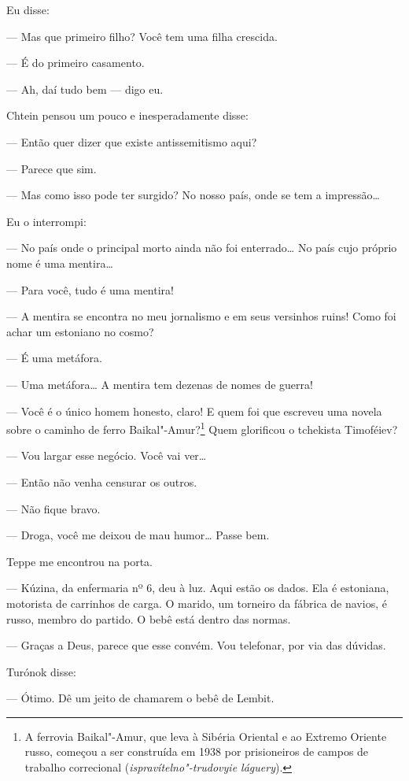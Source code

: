 Eu disse:

--- Mas que primeiro filho? Você tem uma filha crescida.

--- É do primeiro casamento.

--- Ah, daí tudo bem --- digo eu.

Chtein pensou um pouco e inesperadamente disse:

--- Então quer dizer que existe antissemitismo aqui?

--- Parece que sim.

--- Mas como isso pode ter surgido? No nosso país, onde se tem a
impressão\ldots{}

Eu o interrompi:

--- No país onde o principal morto ainda não foi enterrado\ldots{} No país
cujo próprio nome é uma mentira\ldots{}

--- Para você, tudo é uma mentira!

--- A mentira se encontra no meu jornalismo e em seus versinhos ruins!
Como foi achar um estoniano no cosmo?

--- É uma metáfora.

--- Uma metáfora\ldots{} A mentira tem dezenas de nomes de guerra!

--- Você é o único homem honesto, claro! E quem foi que escreveu uma
novela sobre o caminho de ferro Baikal"-Amur?\footnote{A ferrovia
  Baikal"-Amur, que leva à Sibéria Oriental e ao Extremo Oriente russo,
  começou a ser construída em 1938 por prisioneiros de campos de
  trabalho correcional (\emph{ispravítelno"-trudovyie láguery}).} Quem
glorificou o tchekista Timoféiev?

--- Vou largar esse negócio. Você vai ver\ldots{}

--- Então não venha censurar os outros.

--- Não fique bravo.

--- Droga, você me deixou de mau humor\ldots{} Passe bem.

Teppe me encontrou na porta.

--- Kúzina, da enfermaria nº 6, deu à luz. Aqui estão os dados. Ela é \label{ref4}
estoniana, motorista de carrinhos de carga. O marido, um torneiro da
fábrica de navios, é russo, membro do partido. O bebê está dentro das
normas.

--- Graças a Deus, parece que esse convém. Vou telefonar, por via das
dúvidas.

Turónok disse:

--- Ótimo. Dê um jeito de chamarem o bebê de Lembit.


